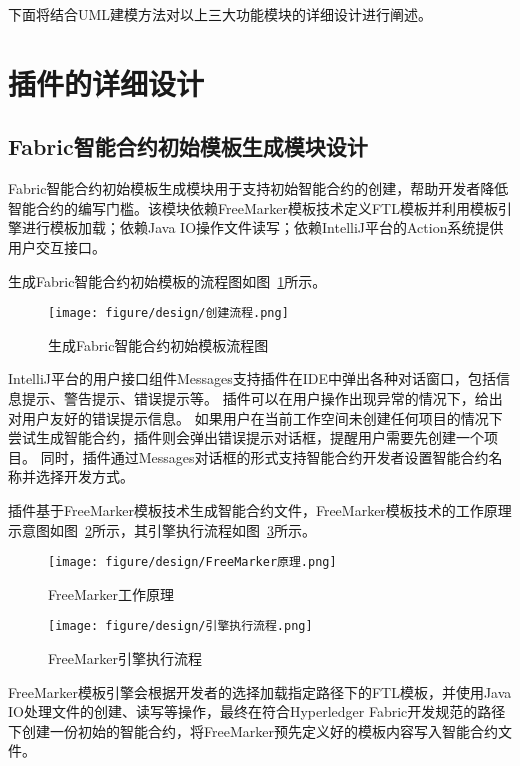 下面将结合UML建模方法对以上三大功能模块的详细设计进行阐述。

\section{插件的详细设计}

\subsection{Fabric智能合约初始模板生成模块设计}

Fabric智能合约初始模板生成模块用于支持初始智能合约的创建，帮助开发者降低智能合约的编写门槛。该模块依赖FreeMarker模板技术定义FTL模板并利用模板引擎进行模板加载；依赖Java IO操作文件读写；依赖IntelliJ平台的Action系统提供用户交互接口。

生成Fabric智能合约初始模板的流程图如图~\ref{fig:3.5}所示。

\begin{figure}[htb]
  \centering
  \texttt{[image: figure/design/创建流程.png]}
  \caption{生成Fabric智能合约初始模板流程图}\label{fig:3.5}
\end{figure}

IntelliJ平台的用户接口组件Messages支持插件在IDE中弹出各种对话窗口，包括信息提示、警告提示、错误提示等。
插件可以在用户操作出现异常的情况下，给出对用户友好的错误提示信息。
如果用户在当前工作空间未创建任何项目的情况下尝试生成智能合约，插件则会弹出错误提示对话框，提醒用户需要先创建一个项目。
同时，插件通过Messages对话框的形式支持智能合约开发者设置智能合约名称并选择开发方式。

插件基于FreeMarker模板技术生成智能合约文件，FreeMarker模板技术的工作原理示意图如图~\ref{fig:3.6}所示，其引擎执行流程如图~\ref{fig:3.7}所示。

\begin{figure}[htb]
  \centering
  \texttt{[image: figure/design/FreeMarker原理.png]}
  \caption{FreeMarker工作原理}\label{fig:3.6}
\end{figure}

\begin{figure}[htb]
  \centering
  \texttt{[image: figure/design/引擎执行流程.png]}
  \caption{FreeMarker引擎执行流程}\label{fig:3.7}
\end{figure}

FreeMarker模板引擎会根据开发者的选择加载指定路径下的FTL模板，并使用Java IO处理文件的创建、读写等操作，最终在符合Hyperledger Fabric开发规范的路径下创建一份初始的智能合约，将FreeMarker预先定义好的模板内容写入智能合约文件。


